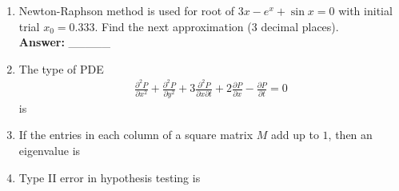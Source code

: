 \documentclass[journal]{IEEEtran}
\begin{document}
\begin{enumerate}[resume]
\item Newton-Raphson method is used for root of $3x - e^x + \sin x = 0$ with initial trial $x_0 = 0.333$. Find the next approximation (3 decimal places). \hfill {} \\[0.5em]
\textbf{Answer:} \_\_\_\_\_

\item The type of PDE
\begin{align}
\frac{\partial^2 P}{\partial x^2} + \frac{\partial^2 P}{\partial y^2} + 3\frac{\partial^2 P}{\partial x \partial t} + 2\frac{\partial P}{\partial x} - \frac{\partial P}{\partial t} = 0
\end{align}
is \hfill {}
\begin{enumerate}
\end{enumerate}

\item If the entries in each column of a square matrix $M$ add up to $1$, then an eigenvalue is \hfill {}
\begin{enumerate}
\end{enumerate}

\item Type II error in hypothesis testing is \hfill {}
\begin{enumerate}
\end{enumerate}


\end{enumerate}
\end{document}
